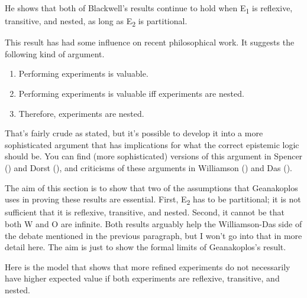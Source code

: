 \documentclass[
  11pt,
  letterpaper,
  DIV=11,
  numbers=noendperiod,
  twoside]{scrartcl}
\providecommand{\tightlist}{%
  \setlength{\itemsep}{0pt}\setlength{\parskip}{0pt}}
\begin{document}
He shows that both of Blackwell's results continue to hold when
E\textsubscript{1} is reflexive, transitive, and nested, as long as
E\textsubscript{2} is partitional.

This result has had some influence on recent philosophical work. It
suggests the following kind of argument.

\begin{enumerate}
\def\labelenumi{\arabic{enumi}.}
\tightlist
\item
  Performing experiments is valuable.
\item
  Performing experiments is valuable iff experiments are nested.
\item
  Therefore, experiments are nested.
\end{enumerate}

That's fairly crude as stated, but it's possible to develop it into a
more sophisticated argument that has implications for what the correct
epistemic logic should be. You can find (more sophisticated) versions of
this argument in Spencer () and Dorst
(), and criticisms of these arguments in
Williamson () and Das
().

The aim of this section is to show that two of the assumptions that
Geanakoplos uses in proving these results are essential. First,
E\textsubscript{2} has to be partitional; it is not sufficient that it
is reflexive, transitive, and nested. Second, it cannot be that both W
and O are infinite. Both results arguably help the Williamson-Das side
of the debate mentioned in the previous paragraph, but I won't go into
that in more detail here. The aim is just to show the formal limits of
Geanakoplos's result.

Here is the model that shows that more refined experiments do not
necessarily have higher expected value if both experiments are
reflexive, transitive, and nested.
\end{document}
